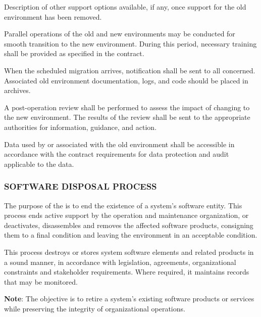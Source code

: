 \begin{adjustwidth}{2em}{0pt}
\begin{compactenum}
\begin{compactenum}
\begin{compactenum}
							\item Description of other support options available, if any, once support for the old environment has been removed.

						\end{compactenum}


						\item Parallel operations of the old and new environments may be conducted for smooth transition to the new environment. During this period, necessary training shall be provided as specified in the contract.

						\item When the scheduled migration arrives, notification shall be sent to all concerned. Associated old environment documentation, logs, and code should be placed in archives.

						\item A post-operation review shall be performed to assess the impact of changing to the new environment. The results of the review shall be sent to the appropriate authorities for information, guidance, and action.

						\item Data used by or associated with the old environment shall be accessible in accordance with the contract requirements for data protection and audit applicable to the data.

					\end{compactenum}

				\end{compactenum}

			\end{adjustwidth}

		\newpage
		\subsubsection{SOFTWARE DISPOSAL PROCESS\label{proc:software_disposal_process}}

			\begin{adjustwidth}{2em}{0pt} 

				The purpose of the  is to end the existence of a system's software entity. This process ends active support by the operation and maintenance organization, or deactivates, disassembles and removes the affected software products, consigning them to a final condition and leaving the environment in an acceptable condition. 

				This process destroys or stores system software elements and related products in a sound manner, in accordance with legislation, agreements, organizational constraints and stakeholder requirements. Where required, it maintains records that may be monitored.
				
				{\bf Note}: The objective is to retire a system's existing software products or services while preserving the integrity of organizational operations.
			
			\end{adjustwidth}

